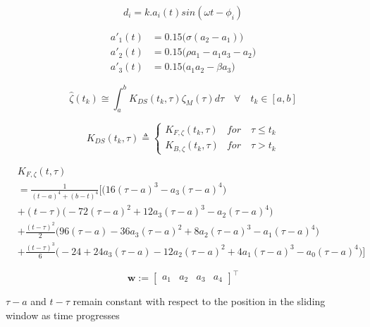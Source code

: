\documentclass[16pt]{article}
\begin{document}
\begin{equation}
d_i = k.a_i(t)sin(\omega t-\phi_i)
\label{eq:dist_1}
\end{equation}
 
\begin{subequations}
\begin{align}
a'_1(t) &= 0.15\big(\sigma(a_2-a_1)\big)\\
a'_2(t) &= 0.15\big(\rho a_1 - a_1 a_3 - a_2\big)\\
a'_3(t) &= 0.15\big(a_1 a_2 - \beta a_3\big)
\end{align}
\end{subequations}


\begin{equation}
	\hat{\zeta}(t_k) \cong \int_a^b K_{DS}(t_k,\tau) \zeta_M(\tau)d\tau
	\quad \forall\quad t_k \in [a,b]
\end{equation}

\begin{equation}
K_{DS}(t_k,\tau) \triangleq \left\{
\begin{array}{lr}
K_{F,\zeta}(t_k,\tau) & for \quad \tau \le t_k\\
K_{B,\zeta}(t_k,\tau) & for \quad \tau > t_k
\end{array}
\right.
\label{K}
\end{equation}


\begin{equation}\label{eqn:forward}
\begin{split}
	& K_{F,\zeta}(t,\tau)\\
	&= \frac{1}{(t-a)^4+(b-t)^4}\bigg[\Big(16(\tau-a)^{3}-a_3(\tau-a)^{4}\Big)\\
	&+(t-\tau)\Big(-72(\tau-a)^2 + 12a_3(\tau-a)^3 - a_2(\tau-a)^4\Big)\\
	&+\frac{(t-\tau)^2}{2}\Big(96(\tau-a) - 36a_3(\tau-a)^2 + 8a_2(\tau-a)^3 -a_1(\tau-a)^4\Big)\\
	&+\frac{(t-\tau)^3}{6}\Big(-24 + 24a_3(\tau-a) - 12a_2(\tau-a)^2 + 4a_1(\tau-a)^3 - a_0(\tau-a)^4\Big)\bigg]	
\end{split}
\end{equation}

$$\mathbf{w}:=\begin{bmatrix}a_1& a_2& a_3&a_4\end{bmatrix}^{\intercal}$$

$\tau -a$ and $t-\tau$ remain constant with respect to the position in the sliding window as time progresses
\end{document}

